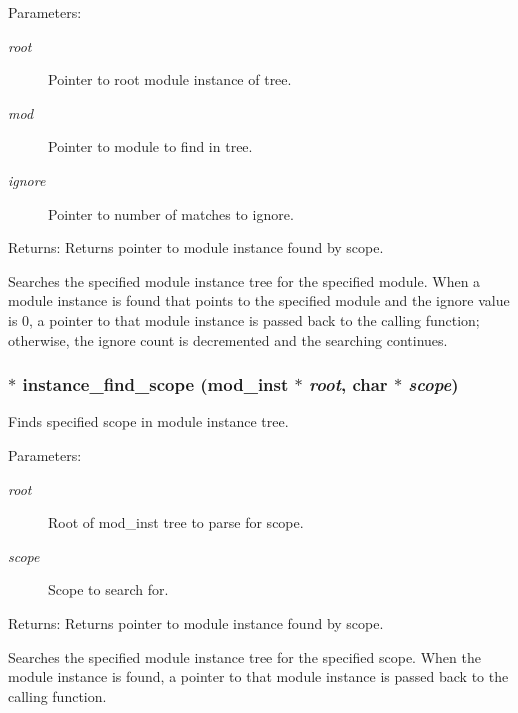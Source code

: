 \begin{Desc}
\item[Parameters:]
\begin{description}
\item[{\em root}]Pointer to root module instance of tree. \item[{\em mod}]Pointer to module to find in tree. \item[{\em ignore}]Pointer to number of matches to ignore.\end{description}
\end{Desc}
\begin{Desc}
\item[Returns:]Returns pointer to module instance found by scope.\end{Desc}
Searches the specified module instance tree for the specified module. When a module instance is found that points to the specified module and the ignore value is 0, a pointer to that module instance is passed back to the calling function; otherwise, the ignore count is decremented and the searching continues. 
\subsubsection{$\ast$ instance\_\-find\_\-scope ({\bf mod\_\-inst} $\ast$ {\em root}, char $\ast$ {\em scope})}\label{instance_8c_a3}


Finds specified scope in module instance tree. 

\begin{Desc}
\item[Parameters:]
\begin{description}
\item[{\em root}]Root of mod\_\-inst tree to parse for scope. \item[{\em scope}]Scope to search for.\end{description}
\end{Desc}
\begin{Desc}
\item[Returns:]Returns pointer to module instance found by scope.\end{Desc}
Searches the specified module instance tree for the specified scope. When the module instance is found, a pointer to that module instance is passed back to the calling function. 
